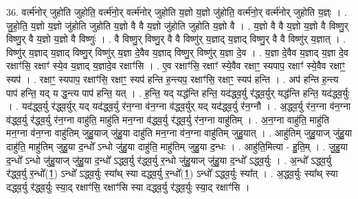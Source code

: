\documentclass[17pt]{extarticle}
\begin{document}
36. वर्त्म॑नोर् जुहोति जुहोति॒ वर्त्म॑नो॒र् वर्त्म॑नोर् जुहोति य॒ज्ञो य॒ज्ञो जु॑होति॒ वर्त्म॑नो॒र् वर्त्म॑नोर् जुहोति य॒ज्ञ्ः । . जु॒हो॒ति॒ य॒ज्ञो य॒ज्ञो जु॑होति जुहोति य॒ज्ञो वै वै य॒ज्ञो जु॑होति जुहोति य॒ज्ञो वै । . य॒ज्ञो वै वै य॒ज्ञो य॒ज्ञो वै विष्णु॒र् विष्णु॒र् वै य॒ज्ञो य॒ज्ञो वै विष्णुः॑ । . वै विष्णु॒र् विष्णु॒र् वै वै विष्णु॑र् य॒ज्ञाद् य॒ज्ञाद् विष्णु॒र् वै वै विष्णु॑र् य॒ज्ञात् । . विष्णु॑र् य॒ज्ञाद् य॒ज्ञाद् विष्णु॒र् विष्णु॑र् य॒ज्ञा दे॒वैव य॒ज्ञाद् विष्णु॒र् विष्णु॑र् य॒ज्ञा दे॒व । . य॒ज्ञा दे॒वैव य॒ज्ञाद् य॒ज्ञा दे॒व रक्षाꣳ॑सि॒ रक्षाꣳ॑ स्ये॒व य॒ज्ञाद् य॒ज्ञादे॒व रक्षाꣳ॑सि । . ए॒व रक्षाꣳ॑सि॒ रक्षाꣳ॑ स्ये॒वैव रक्षाꣳ॒॒ स्यपाप॒ रक्षाꣳ॑ स्ये॒वैव रक्षाꣳ॒॒ स्यप॑ । . रक्षाꣳ॒॒ स्यपाप॒ रक्षाꣳ॑सि॒ रक्षाꣳ॒॒ स्यप॑ हन्ति ह॒न्त्यप॒ रक्षाꣳ॑सि॒ रक्षाꣳ॒॒ स्यप॑ हन्ति । . अप॑ हन्ति ह॒न्त्य पाप॑ हन्ति॒ यद् य द्ध॒न्त्य पाप॑ हन्ति॒ यत् । . ह॒न्ति॒ यद् यद्ध॑न्ति हन्ति॒ यद॑द्ध्व॒र्यु र॑द्ध्व॒र्युर् यद्ध॑न्ति हन्ति॒ यद॑द्ध्व॒र्युः । . यद॑द्ध्व॒र्यु र॑द्ध्व॒र्युर् यद् यद॑द्ध्व॒र्यु र॑न॒ग्ना व॑न॒ग्ना व॑द्ध्व॒र्युर् यद् यद॑द्ध्व॒र्यु र॑न॒ग्नौ । . अ॒द्ध्व॒र्यु र॑न॒ग्ना व॑न॒ग्ना व॑द्ध्व॒र्यु र॑द्ध्व॒र्यु र॑न॒ग्ना वाहु॑ति॒ माहु॑ति मन॒ग्ना व॑द्ध्व॒र्यु र॑द्ध्व॒र्यु र॑न॒ग्ना वाहु॑तिम् । . अ॒न॒ग्ना वाहु॑ति॒ माहु॑ति मन॒ग्ना व॑न॒ग्ना वाहु॑तिम् जुहु॒याज् जु॑हु॒या दाहु॑ति मन॒ग्ना व॑न॒ग्ना वाहु॑तिम् जुहु॒यात् । . आहु॑तिम् जुहु॒याज् जु॑हु॒या दाहु॑ति॒ माहु॑तिम् जुहु॒या द॒न्धो᳚ ऽन्धो जु॑हु॒या दाहु॑ति॒ माहु॑तिम् जुहु॒या द॒न्धः । . आहु॑ति॒मित्या - हु॒ति॒म् । . जु॒हु॒या द॒न्धो᳚ ऽन्धो जु॑हु॒याज् जु॑हु॒या द॒न्धो᳚ ऽद्ध्व॒र्यु र॑द्ध्व॒र्यु र॒न्धो जु॑हु॒याज् जु॑हु॒या द॒न्धो᳚ ऽद्ध्व॒र्युः । . अ॒न्धो᳚ ऽद्ध्व॒र्यु र॑द्ध्व॒र्यु र॒न्धो᳚(1॒) ऽन्धो᳚ ऽद्ध्व॒र्युः स्या᳚थ् स्या दद्ध्व॒र्यु र॒न्धो᳚(1॒) ऽन्धो᳚ ऽद्ध्व॒र्युः स्या᳚त् । . अ॒द्ध्व॒र्युः स्या᳚थ् स्या दद्ध्व॒र्यु र॑द्ध्व॒र्युः स्या॒द् रक्षाꣳ॑सि॒ रक्षाꣳ॑सि स्या दद्ध्व॒र्यु र॑द्ध्व॒र्युः स्या॒द् रक्षाꣳ॑सि । \newline
\end{document}

